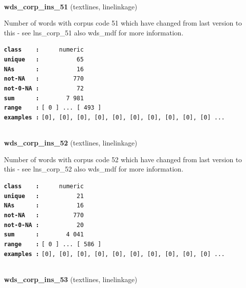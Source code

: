 \documentclass[]{article}
\begin{document}
~

\textbf{wds\_corp\_ins\_51} (textlines, linelinkage)

Number of words with corpus code 51 which have changed from last version
to this - see lns\_corp\_51 also wds\_mdf for more information.

\textbf{\texttt{class\ \ \ \ :}} \texttt{~~~~~numeric}\\
\textbf{\texttt{unique\ \ \ :}} \texttt{~~~~~~~~~~65}\\
\textbf{\texttt{NAs\ \ \ \ \ \ :}} \texttt{~~~~~~~~~~16}\\
\textbf{\texttt{not-NA\ \ \ :}} \texttt{~~~~~~~~~770}\\
\textbf{\texttt{not-0-NA\ :}} \texttt{~~~~~~~~~~72}\\
\textbf{\texttt{sum\ \ \ \ \ \ :}} \texttt{~~~~~~~7~981}\\
\textbf{\texttt{range\ \ \ \ :}}
\texttt{{[}\ 0\ {]}\ ...\ {[}\ 493\ {]}}\\
\textbf{\texttt{examples\ :}}
\texttt{{[}0{]},\ {[}0{]},\ {[}0{]},\ {[}0{]},\ {[}0{]},\ {[}0{]},\ {[}0{]},\ {[}0{]},\ {[}0{]},\ {[}0{]}\ ...}\\

~

\textbf{wds\_corp\_ins\_52} (textlines, linelinkage)

Number of words with corpus code 52 which have changed from last version
to this - see lns\_corp\_52 also wds\_mdf for more information.

\textbf{\texttt{class\ \ \ \ :}} \texttt{~~~~~numeric}\\
\textbf{\texttt{unique\ \ \ :}} \texttt{~~~~~~~~~~21}\\
\textbf{\texttt{NAs\ \ \ \ \ \ :}} \texttt{~~~~~~~~~~16}\\
\textbf{\texttt{not-NA\ \ \ :}} \texttt{~~~~~~~~~770}\\
\textbf{\texttt{not-0-NA\ :}} \texttt{~~~~~~~~~~20}\\
\textbf{\texttt{sum\ \ \ \ \ \ :}} \texttt{~~~~~~~4~041}\\
\textbf{\texttt{range\ \ \ \ :}}
\texttt{{[}\ 0\ {]}\ ...\ {[}\ 586\ {]}}\\
\textbf{\texttt{examples\ :}}
\texttt{{[}0{]},\ {[}0{]},\ {[}0{]},\ {[}0{]},\ {[}0{]},\ {[}0{]},\ {[}0{]},\ {[}0{]},\ {[}0{]},\ {[}0{]}\ ...}\\

~

\textbf{wds\_corp\_ins\_53} (textlines, linelinkage)
\end{document}
